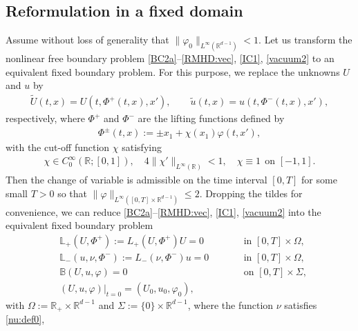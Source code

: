 \documentclass[twoside,11pt]{article}
\numberwithin{equation}{section}
\begin{document}
\subsection{Reformulation in a fixed domain} \label{sec2.2}
Assume without loss of generality that $\|\varphi_0\|_{L^{\infty}(\mathbb{R}^{d-1})}<1$.
Let us transform the nonlinear free boundary problem \eqref{BC2a}--\eqref{RMHD:vec}, \eqref{IC1}, \eqref{vacuum2} to an equivalent fixed boundary problem.
For this purpose, we replace the unknowns $U$ and $u$ by
\begin{align} \nonumber %
	\widetilde{U}({t},x)=U(t,\Phi^+({t}, {x}), {x}'),\qquad  \tilde{u}({t}, {x})=u(t,\Phi^-({t}, {x}), {x}'),
\end{align}
respectively, where $\Phi^{+}$ and $\Phi^-$ are the lifting functions defined by
\begin{align} \label{Phi:def}
	\Phi^{\pm}(t,x):=\pm x_1+ \chi( x_1)\varphi(t,x'),
\end{align}
with the cut-off function $\chi$ satisfying
\begin{align} \label{chi:def}
	\chi\in C^{\infty}_0(\mathbb{R}; [0,1]),\quad 4\|\chi'\|_{L^{\infty}(\mathbb{R})} < 1,\quad
	\chi\equiv1 \ \ \textrm{on } [-1,1].
\end{align}
Then the change of variable is admissible on the time interval $[0,T]$ for some small $T>0$ so that
 $\|\varphi\|_{L^{\infty}([0,T]\times\mathbb{R}^{d-1})}	\leq 2$.
Dropping  the tildes for convenience,
we can reduce \eqref{BC2a}--\eqref{RMHD:vec}, \eqref{IC1}, \eqref{vacuum2} into the equivalent fixed boundary problem
	\begin{subequations} \label{NP1}
		\begin{alignat}{2}
			\label{NP1a}
			&\mathbb{L}_+(U,\Phi^+) :=L_+(U,\Phi^+)U =0
			& &\textrm{in  }  [0,T]\times
			\Omega,\\
			\label{NP1b}
			&\mathbb{L}_-(u,\nu,\Phi^-) :=L_-(\nu,\Phi^-)u =0
			& &\textrm{in  }  [0,T]\times
			\Omega,\\
			\label{NP1c}
			&  \mathbb{B}(U,u,\varphi)=0
			&\qquad&\textrm{on  }    [0,T]\times \Sigma,\\
			\label{NP1d}
			&(U,u, \varphi)|_{t=0}=(U_0,u_0,\varphi_0),  &  &
		\end{alignat}
	\end{subequations}
with $\Omega:=\mathbb{R}_+\times \mathbb{R}^{d-1}$ and
$\Sigma:=\{0\}\times \mathbb{R}^{d-1}$,
where the function $\nu$ satisfies \eqref{nu:def0},
\end{document}
